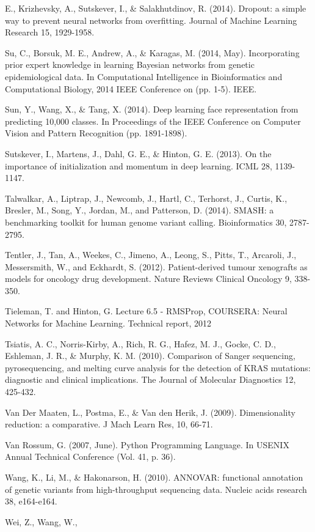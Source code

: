 \documentclass{article}
\begin{document}
\begin{list}{}{%
\setlength{\topsep}{0pt}%
\setlength{\leftmargin}{0.5in}%
\setlength{\listparindent}{-0.5in}%
\setlength{\itemindent}{-0.5in}%
\setlength{\parsep}{\parskip}%
}
E., Krizhevsky, A., Sutskever, I., \& Salakhutdinov, R. (2014). Dropout: a simple way to prevent neural networks from overfitting. Journal of Machine Learning Research 15, 1929-1958.\\\item[] Su, C., Borsuk, M. E., Andrew, A., \& Karagas, M. (2014, May). Incorporating prior expert knowledge in learning Bayesian networks from genetic epidemiological data. In Computational Intelligence in Bioinformatics and Computational Biology, 2014 IEEE Conference on (pp. 1-5). IEEE.\\\item[] Sun, Y., Wang, X., \& Tang, X. (2014). Deep learning face representation from predicting 10,000 classes. In Proceedings of the IEEE Conference on Computer Vision and Pattern Recognition (pp. 1891-1898).\\\item[] Sutskever, I., Martens, J., Dahl, G. E., \& Hinton, G. E. (2013). On the importance of initialization and momentum in deep learning. ICML 28, 1139-1147.\\\item[] Talwalkar, A., Liptrap, J., Newcomb, J., Hartl, C., Terhorst, J., Curtis, K., Bresler, M., Song, Y., Jordan, M., and Patterson, D. (2014). SMASH: a benchmarking toolkit for human genome variant calling. Bioinformatics 30, 2787-2795.\\\item[] Tentler, J., Tan, A., Weekes, C., Jimeno, A., Leong, S., Pitts, T., Arcaroli, J., Messersmith, W., and Eckhardt, S. (2012). Patient-derived tumour xenografts as models for oncology drug development. Nature Reviews Clinical Oncology 9, 338-350.\\\item[] Tieleman, T. and Hinton, G. Lecture 6.5 - RMSProp, COURSERA: Neural Networks for Machine Learning. Technical report, 2012\\\item[] Tsiatis, A. C., Norris-Kirby, A., Rich, R. G., Hafez, M. J., Gocke, C. D., Eshleman, J. R., \& Murphy, K. M. (2010). Comparison of Sanger sequencing, pyrosequencing, and melting curve analysis for the detection of KRAS mutations: diagnostic and clinical implications. The Journal of Molecular Diagnostics 12, 425-432.\\\item[] Van Der Maaten, L., Postma, E., \& Van den Herik, J. (2009). Dimensionality reduction: a comparative. J Mach Learn Res, 10, 66-71.\\\item[] Van Rossum, G. (2007, June). Python Programming Language. In USENIX Annual Technical Conference (Vol. 41, p. 36).\\\item[] Wang, K., Li, M., \& Hakonarson, H. (2010). ANNOVAR: functional annotation of genetic variants from high-throughput sequencing data. Nucleic acids research 38, e164-e164.\\\item[] Wei, Z., Wang, W., 
\end{list}
\end{document}
